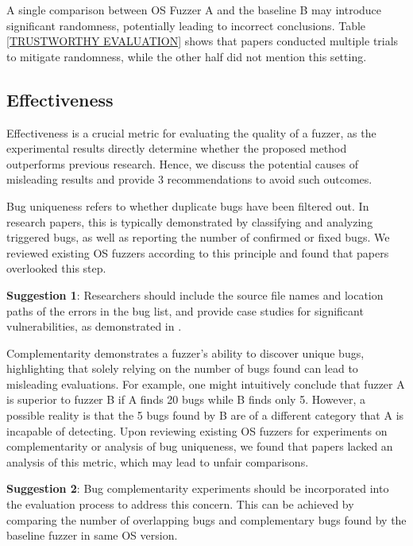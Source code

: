 A single comparison between OS Fuzzer A and the baseline B may introduce significant randomness, potentially leading to incorrect conclusions. Table \ref{TRUSTWORTHY EVALUATION} shows that  papers conducted multiple trials to mitigate randomness, while the other half did not mention this setting.
\subsection{Effectiveness}
Effectiveness is a crucial metric for evaluating the quality of a fuzzer, as the experimental results directly determine whether the proposed method outperforms previous research. Hence, we discuss the potential causes of misleading results and provide 3 recommendations to avoid such outcomes.

Bug uniqueness refers to whether duplicate bugs have been filtered out. In research papers, this is typically demonstrated by classifying and analyzing triggered bugs, as well as reporting the number of confirmed or fixed bugs. We reviewed existing OS fuzzers according to this principle and found that  papers overlooked this step.

\begin{tcolorbox}[colback=gray!10!white, colframe=black,left=-0cm, right=-0cm, top=-0cm, bottom=-0cm]
\textbf{Suggestion 1}: Researchers should include the source file names and location paths of the errors in the bug list, and provide case studies for significant vulnerabilities, as demonstrated in \cite{lin2022grebe, bulekov2022morphuzz, CONZZER2022context, chen2022sfuzz}.
\end{tcolorbox}

Complementarity demonstrates a fuzzer's ability to discover unique bugs, highlighting that solely relying on the number of bugs found can lead to misleading evaluations. For example, one might intuitively conclude that fuzzer A is superior to fuzzer B if A finds 20 bugs while B finds only 5. However, a possible reality is that the 5 bugs found by B are of a different category that A is incapable of detecting. Upon reviewing existing OS fuzzers for experiments on complementarity or analysis of bug uniqueness, we found that  papers lacked an analysis of this metric, which may lead to unfair comparisons.

\begin{tcolorbox}[colback=gray!10!white, colframe=black,left=-0cm, right=-0cm, top=-0cm, bottom=-0cm]
\textbf{Suggestion 2}: Bug complementarity experiments should be incorporated into the evaluation process to address this concern. This can be achieved by comparing the number of overlapping bugs and complementary bugs found by the baseline fuzzer in same OS version.
\end{tcolorbox}

